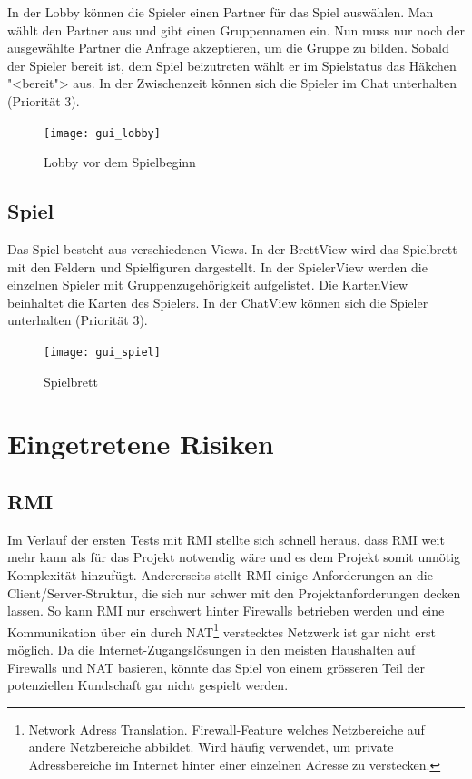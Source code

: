 \documentclass[12pt,halfparskip]{scrartcl}
\begin{document}
In der Lobby können die Spieler einen Partner für das Spiel auswählen. Man wählt den Partner aus und gibt einen Gruppennamen ein. Nun muss nur noch der ausgewählte Partner die Anfrage akzeptieren, um die Gruppe zu bilden. Sobald der Spieler bereit ist, dem Spiel beizutreten wählt er im Spielstatus das Häkchen "<bereit"> aus. In der Zwischenzeit können sich die Spieler im Chat unterhalten (Priorität 3).

\begin{figure}[h]
	\centering
	\texttt{[image: gui\_lobby]}
	\caption{Lobby vor dem Spielbeginn}
	\label{fig:gui_lobby}
\end{figure}

\clearpage

\subsection{Spiel} %
\label{externes_design_spielbrett}

Das Spiel besteht aus verschiedenen Views. In der BrettView wird das Spielbrett mit den Feldern und Spielfiguren dargestellt. In der SpielerView werden die einzelnen Spieler mit Gruppenzugehörigkeit aufgelistet. Die KartenView beinhaltet die Karten des Spielers. In der ChatView können sich die Spieler unterhalten (Priorität 3).

\begin{figure}[h]
	\centering
	\texttt{[image: gui\_spiel]}
	\caption{Spielbrett}
	\label{fig:gui_spiel}
\end{figure}


\clearpage
\section{Eingetretene Risiken} %
\label{eingetretene_risiken}

\subsection{RMI} %
\label{sub:rmi}

Im Verlauf der ersten Tests mit RMI stellte sich schnell heraus, dass RMI weit mehr kann als für das Projekt notwendig wäre und es dem Projekt somit unnötig Komplexität hinzufügt. Andererseits stellt RMI  einige Anforderungen an die Client/Server-Struktur, die sich nur schwer mit den Projektanforderungen decken lassen. So kann RMI nur erschwert hinter Firewalls betrieben werden und eine Kommunikation über ein durch NAT\footnote{Network Adress Translation. Firewall-Feature welches Netzbereiche auf andere Netzbereiche abbildet. Wird häufig verwendet, um private Adressbereiche im Internet hinter einer einzelnen Adresse zu verstecken.} verstecktes Netzwerk ist gar nicht erst möglich. Da die Internet-Zugangslösungen in den meisten Haushalten auf Firewalls und NAT basieren, könnte das Spiel von einem grösseren Teil der potenziellen Kundschaft gar nicht gespielt werden.
\end{document}
